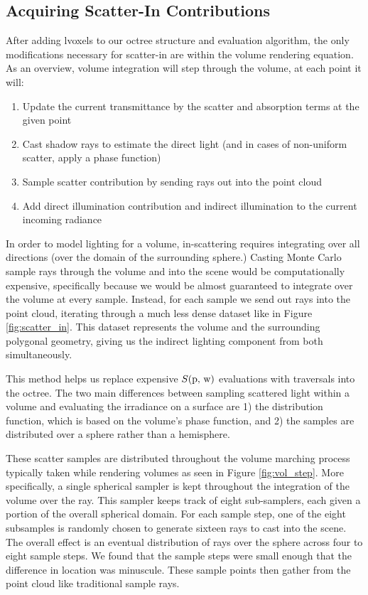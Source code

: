\documentclass[12pt]{ucthesis}
\begin{document}
\subsection{Acquiring Scatter-In Contributions}
\label{scatterin_sec}
After adding lvoxels to our octree structure and evaluation algorithm, the only modifications necessary for scatter-in are within the volume rendering equation.  As an overview, volume integration will step through the volume, at each point it will:

\begin{enumerate}
\item Update the current transmittance by the scatter and absorption terms at the given point
\item Cast shadow rays to estimate the direct light (and in cases of non-uniform scatter, apply a phase function)
\item Sample scatter contribution by sending rays out into the point cloud
\item Add direct illumination contribution and indirect illumination to the current incoming radiance
\end{enumerate}

In order to model lighting for a volume, in-scattering requires integrating over all directions (over the domain of the surrounding sphere.)  Casting Monte Carlo sample rays through the volume and into the scene would be computationally expensive, specifically because we would be almost guaranteed to integrate over the volume at every sample.  Instead, for each sample we send out rays into the point cloud, iterating through a much less dense dataset like in Figure \ref{fig:scatter_in}.  This dataset represents the volume and the surrounding polygonal geometry, giving us the indirect lighting component from both simultaneously.

This method helps us replace expensive $S(\textup{p, w})$ evaluations with traversals into the octree.  The two main differences between sampling scattered light within a volume and evaluating the irradiance on a surface are 1) the distribution function, which is based on the volume's phase function, and 2) the samples are distributed over a sphere rather than a hemisphere.

These scatter samples are distributed throughout the volume marching process typically taken while rendering volumes as seen in Figure \ref{fig:vol_step}.  More specifically, a single spherical sampler is kept throughout the integration of the volume over the ray.  This sampler keeps track of eight sub-samplers, each given a portion of the overall spherical domain.  For each sample step, one of the eight subsamples is randomly chosen to generate sixteen rays to cast into the scene.  The overall effect is an eventual distribution of rays over the sphere across four to eight sample steps.  We found that the sample steps were small enough that the difference in location was minuscule.  These sample points then gather from the point cloud like traditional sample rays.
\end{document}
